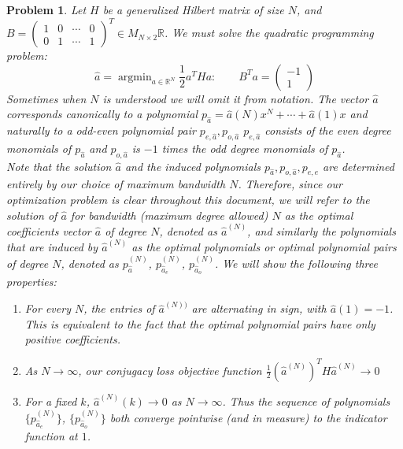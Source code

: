 \documentclass{article}
\newtheorem{prob}[thm]{Problem}
\theoremstyle{definition}
\theoremstyle{remark}
\numberwithin{equation}{section}
\DeclareMathOperator{\argmin}{argmin}
\begin{document}
\begin{prob}\label{quad-prog-problem}
Let $H$ be a generalized Hilbert matrix of size $N$, and $B = \begin{pmatrix} 1 & 0 & \cdots & 0 \\
0 & 1 & \cdots & 1\end{pmatrix} ^T \in M_{N\times 2}\mathbb{R}$. We must solve the quadratic programming problem: 
\begin{equation}\label{constrained-objective-function}
\hat{a}= \argmin_{a\in\mathbb{R}^N} \frac{1}{2} a^THa : \qquad B^Ta = \begin{pmatrix} -1 \\ 1 \end{pmatrix}
\end{equation} Sometimes when $N$ is understood we will omit it from notation. The vector $\hat{a}$ corresponds canonically to a polynomial $p_{\hat{a}} = \hat{a}(N) x^N + \cdots + \hat{a}(1) x$ and naturally to a odd-even polynomial pair $p_{e, \hat{a}}, p_{o, \hat{a}}$ $p_{e,\hat{a}}$ consists of the even degree monomials of $p_{\hat{a}}$ and $p_{o, \hat{a}}$ is $-1$ times the odd degree monomials of $p_{\hat{a}}$. \\
Note that the solution $\hat{a}$ and the induced polynomials $p_{\hat{a}}, p_{o, \hat{a}}, p_{e,\hat{e}}$ are determined entirely by our choice of maximum bandwidth $N$. Therefore, since our optimization problem is clear throughout this document, we will refer to the solution of $\hat{a}$ for bandwidth (maximum degree allowed) $N$ as \emph{the optimal coefficients vector $\hat{a}$ of degree $N$}, denoted as $\hat{a}^{(N)}$, and similarly the polynomials that are induced by $\hat{a}^(N)$ as the \emph{optimal polynomials or optimal polynomial pairs of degree $N$}, denoted as $p_{\hat{a}}^{(N)}$, $p_{\hat{a}_e}^{(N)}$, $p_{\hat{a}_o}^{(N)}$. 
We will show the following three properties: 
\begin{enumerate}
\item For every $N$, the entries of $\hat{a}^{(N))}$ are alternating in sign, with $\hat{a}(1) = -1$. This is equivalent to the fact that the optimal polynomial pairs have only positive coefficients.

\item As $N\to \infty$, our conjugacy loss objective function $\frac{1}{2} (\hat{a}^{(N)} )^T H \hat{a}^{(N)}\to 0$

\item For a fixed $k$, $\hat{a}^{(N)}(k) \to 0$ as $N\to \infty$. Thus the sequence of polynomials $\{p_{\hat{a}_e}^{(N)}\}$, $\{p_{\hat{a}_o}^{(N)}\}$ both converge pointwise (and in measure) to the indicator function at $1$.
\end{enumerate}
\end{prob}
\end{document}
